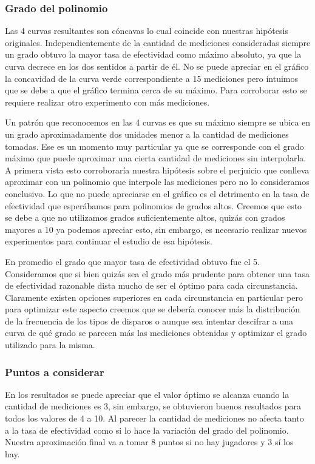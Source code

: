 \subsubsection{Grado del polinomio}
Las 4 curvas resultantes son cóncavas lo cual coincide con nuestras hipótesis originales. Independientemente de la cantidad
de mediciones consideradas siempre un grado obtuvo la mayor tasa de efectividad como máximo absoluto, ya que la curva decrece
en los dos sentidos a partir de él. No se puede apreciar en el gráfico la concavidad de la curva verde correspondiente a 15 mediciones
pero intuimos que se debe a que el gráfico termina cerca de su máximo. Para corroborar esto se requiere realizar otro experimento
con más mediciones.
\par
Un patrón que reconocemos en las 4 curvas es que su máximo siempre se ubica en un grado aproximadamente dos unidades menor a la
cantidad de mediciones tomadas. Ese es un momento muy particular ya que se corresponde con el grado máximo que puede aproximar
una cierta cantidad de mediciones sin interpolarla. A primera vista esto corroboraría nuestra hipótesis sobre el perjuicio que
conlleva aproximar con un polinomio que interpole las mediciones pero no lo consideramos conclusivo. Lo que no puede apreciarse 
en el gráfico es el detrimento en la tasa de efectividad que esperábamos para polinomios de grados altos. Creemos que esto se 
debe a que no utilizamos grados suficientemente altos, quizás con grados mayores a 10 ya podemos apreciar esto, sin embargo, 
es necesario realizar nuevos experimentos para continuar el estudio de esa hipótesis.
\par
En promedio el grado que mayor tasa de efectividad obtuvo fue el 5. Consideramos que si bien quizás sea el grado más prudente
para obtener una tasa de efectividad razonable dista mucho de ser el óptimo para cada circunstancia. Claramente existen
opciones superiores en cada circunstancia en particular pero para optimizar este aspecto creemos que se debería conocer
más la distribución de la frecuencia de los tipos de disparos o aunque sea intentar descifrar a una curva de qué grado
se parecen más las mediciones obtenidas y optimizar el grado utilizado para la misma.

\subsubsection{Puntos a considerar}
En los resultados se puede apreciar que el valor óptimo se alcanza cuando la cantidad de mediciones es 3, sin embargo, se obtuvieron 
buenos resultados para todos los valores de 4 a 10. Al parecer la cantidad de mediciones no afecta tanto a la tasa de efectividad como 
si lo hace la variación del grado del polinomio. Nuestra aproximación final va a tomar 8 puntos si no hay jugadores y 3 sí los hay.




